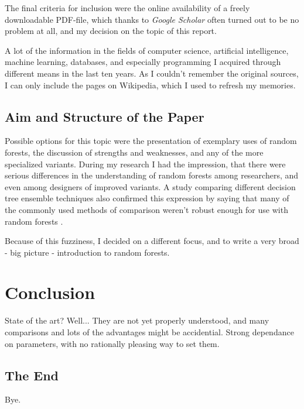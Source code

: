 \documentclass[a4paper,man,12pt,apacite]{apa6} %
\begin{document}
The final criteria for inclusion were the online availability of a freely
downloadable PDF-file, which thanks to \emph{Google Scholar} often turned
out to be no problem at all, and my decision on the topic of
this report.

A lot of the information in the fields of computer science, artificial
intelligence, machine learning, databases, and especially programming
I acquired through different means in the last ten years.
As I couldn't remember the original sources, I can only include the pages
on Wikipedia, which I used to refresh my memories.

\subsection{Aim and Structure of the Paper}
Possible options for this topic were the presentation of
exemplary uses of random
forests, the discussion of strengths and weaknesses, and any of the more
specialized variants.
During my research I had the impression, that there were serious
differences in the understanding of random forests among researchers,
and even among designers of improved variants.
A study comparing different decision tree ensemble techniques also confirmed
this expression by saying that many of the commonly used methods of comparison
weren't robust enough for use with random forests \cite{banfield2007comparison}.

Because of this fuzziness, I decided on a different focus, and to write
a very broad - big picture - introduction to random forests.

\section{Conclusion}
State of the art? Well... They are not yet properly understood, and
many comparisons and lots of the advantages might be accidential.
Strong dependance on parameters, with no rationally pleasing way to set them.

\subsection{The End}
Bye.


\end{document}
